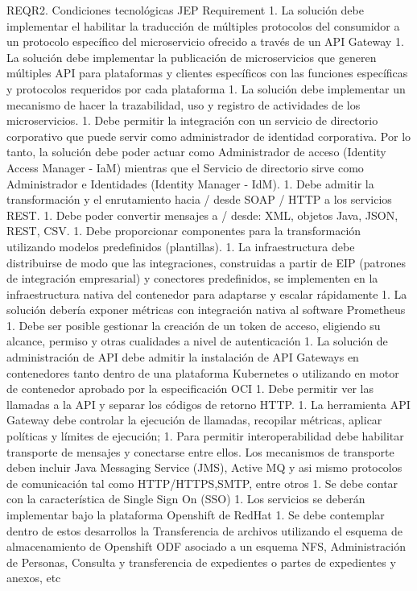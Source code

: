 \documentclass[
  paper=a4,
  ,captions=tableheading
]{scrartcl}
\begin{document}
\textbar{} \textbar{} REQR2. Condiciones tecnológicas JEP \textbar{}
Requirement \textbar{} 1. La solución debe implementar el habilitar la
traducción de múltiples protocolos del consumidor a un protocolo
específico del microservicio ofrecido a través de un API Gateway 1. La
solución debe implementar la publicación de microservicios que generen
múltiples API para plataformas y clientes específicos con las funciones
específicas y protocolos requeridos por cada plataforma 1. La solución
debe implementar un mecanismo de hacer la trazabilidad, uso y registro
de actividades de los microservicios. 1. Debe permitir la integración
con un servicio de directorio corporativo que puede servir como
administrador de identidad corporativa. Por lo tanto, la solución debe
poder actuar como Administrador de acceso (Identity Access Manager -
IaM) mientras que el Servicio de directorio sirve como Administrador e
Identidades (Identity Manager - IdM). 1. Debe admitir la transformación
y el enrutamiento hacia / desde SOAP / HTTP a los servicios REST. 1.
Debe poder convertir mensajes a / desde: XML, objetos Java, JSON, REST,
CSV. 1. Debe proporcionar componentes para la transformación utilizando
modelos predefinidos (plantillas). 1. La infraestructura debe
distribuirse de modo que las integraciones, construidas a partir de EIP
(patrones de integración empresarial) y conectores predefinidos, se
implementen en la infraestructura nativa del contenedor para adaptarse y
escalar rápidamente 1. La solución debería exponer métricas con
integración nativa al software Prometheus 1. Debe ser posible gestionar
la creación de un token de acceso, eligiendo su alcance, permiso y otras
cualidades a nivel de autenticación 1. La solución de administración de
API debe admitir la instalación de API Gateways en contenedores tanto
dentro de una plataforma Kubernetes o utilizando en motor de contenedor
aprobado por la especificación OCI 1. Debe permitir ver las llamadas a
la API y separar los códigos de retorno HTTP. 1. La herramienta API
Gateway debe controlar la ejecución de llamadas, recopilar métricas,
aplicar políticas y límites de ejecución; 1. Para permitir
interoperabilidad debe habilitar transporte de mensajes y conectarse
entre ellos. Los mecanismos de transporte deben incluir Java Messaging
Service (JMS), Active MQ y asi mismo protocolos de comunicación tal como
HTTP/HTTPS,SMTP, entre otros 1. Se debe contar con la característica de
Single Sign On (SSO) 1. Los servicios se deberán implementar bajo la
plataforma Openshift de RedHat 1. Se debe contemplar dentro de estos
desarrollos la Transferencia de archivos utilizando el esquema de
almacenamiento de Openshift ODF asociado a un esquema NFS,
Administración de Personas, Consulta y transferencia de expedientes o
partes de expedientes y anexos, etc
\end{document}
